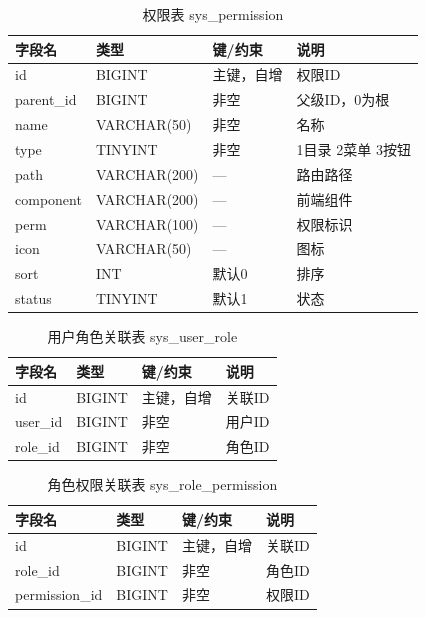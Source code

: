 \documentclass[12pt,hyperref,a4paper,UTF8]{ctexart}
\begin{document}
\begin{table}[!htbp]
    \centering
    \caption{权限表 sys\_permission}
    \begin{tabularx}{0.90\textwidth}{@{}L{3.0cm} L{3.2cm} L{2.5cm} Y@{}}
    \toprule
    \textbf{字段名} & \textbf{类型} & \textbf{键/约束} & \textbf{说明} \\
    \midrule
    id & BIGINT & 主键，自增 & 权限ID \\
    parent\_id & BIGINT & 非空 & 父级ID，0为根 \\
    name & VARCHAR(50) & 非空 & 名称 \\
    type & TINYINT & 非空 & 1目录 2菜单 3按钮 \\
    path & VARCHAR(200) & — & 路由路径 \\
    component & VARCHAR(200) & — & 前端组件 \\
    perm & VARCHAR(100) & — & 权限标识 \\
    icon & VARCHAR(50) & — & 图标 \\
    sort & INT & 默认0 & 排序 \\
    status & TINYINT & 默认1 & 状态 \\
    \bottomrule
    \end{tabularx}
\end{table}

\begin{table}[!htbp]
    \centering
    \caption{用户角色关联表 sys\_user\_role}
    \begin{tabularx}{0.90\textwidth}{@{}L{3.0cm} L{3.2cm} L{2.5cm} Y@{}}
    \toprule
    \textbf{字段名} & \textbf{类型} & \textbf{键/约束} & \textbf{说明} \\
    \midrule
    id & BIGINT & 主键，自增 & 关联ID \\
    user\_id & BIGINT & 非空 & 用户ID \\
    role\_id & BIGINT & 非空 & 角色ID \\
    \bottomrule
    \end{tabularx}
\end{table}

\begin{table}[!htbp]
    \centering
    \caption{角色权限关联表 sys\_role\_permission}
    \begin{tabularx}{0.90\textwidth}{@{}L{3.0cm} L{3.2cm} L{2.5cm} Y@{}}
    \toprule
    \textbf{字段名} & \textbf{类型} & \textbf{键/约束} & \textbf{说明} \\
    \midrule
    id & BIGINT & 主键，自增 & 关联ID \\
    role\_id & BIGINT & 非空 & 角色ID \\
    permission\_id & BIGINT & 非空 & 权限ID \\
    \bottomrule
    \end{tabularx}
\end{table}
\end{document}
